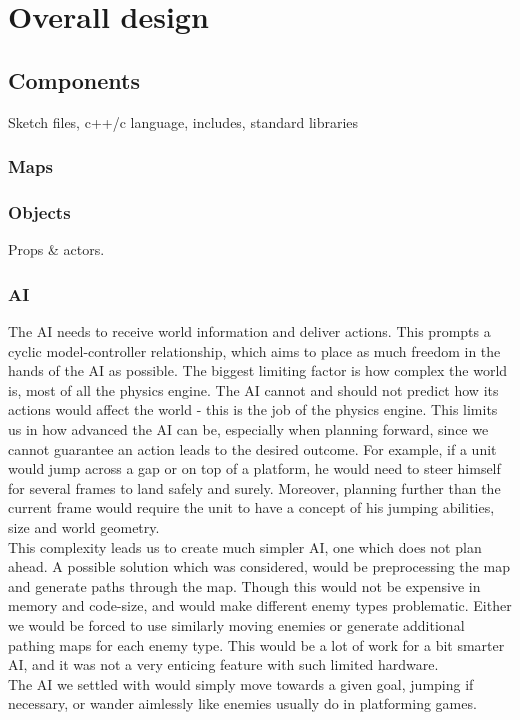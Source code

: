 \chapter{Overall design}

\section{Components}
Sketch files, c++/c language, includes, standard libraries

\subsection{Maps}

\subsection{Objects}
Props \& actors.

\subsection{AI} %
The AI needs to receive world information and deliver actions. This prompts a cyclic model-controller relationship, which aims to place as much freedom in the hands of the AI as possible. The biggest limiting factor is how complex the world is, most of all the physics engine. The AI cannot and should not predict how its actions would affect the world - this is the job of the physics engine. This limits us in how advanced the AI can be, especially when planning forward, since we cannot guarantee an action leads to the desired outcome. For example, if a unit would jump across a gap or on top of a platform, he would need to steer himself for several frames to land safely and surely. Moreover, planning further than the current frame would require the unit to have a concept of his jumping abilities, size and world geometry.\\
This complexity leads us to create much simpler AI, one which does not plan ahead. A possible solution which was considered, would be preprocessing the map and generate paths through the map. Though this would not be expensive in memory and code-size, and would make different enemy types problematic. Either we would be forced to use similarly moving enemies or generate additional pathing maps for each enemy type. This would be a lot of work for a bit smarter AI, and it was not a very enticing feature with such limited hardware.\\
The AI we settled with would simply move towards a given goal, jumping if necessary, or wander aimlessly like enemies usually do in platforming games.

